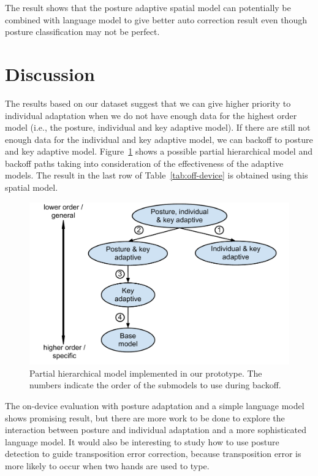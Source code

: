 \documentclass{sigchi}
\begin{document}
The result shows that the posture adaptive spatial model can potentially be combined 
with language model to give better auto correction result even though posture
classification may not be perfect. 

\section{Discussion}
The results based on our dataset suggest that we
can give higher priority to individual adaptation when we do not have enough data for
the highest order model (i.e., the posture, individual and key adaptive model). 
If there are still not enough data for the individual and key adaptive model, we 
can backoff to posture and key adaptive model. Figure~\ref{fig:partial-hierarchy} 
shows a possible partial hierarchical model and backoff paths taking into consideration
of the effectiveness of the adaptive models. The result in the
last row of Table~\ref{tab:off-device} is obtained using this spatial model.

\begin{figure}
  \centering
  \includegraphics[width=0.9\columnwidth]{figures/partial-hierarchy.pdf}
  \caption{Partial hierarchical model implemented in our prototype. The numbers indicate the order of the 
submodels to use during backoff.}
  \label{fig:partial-hierarchy}
\end{figure}
The on-device evaluation with posture adaptation and a simple language model shows promising result, but there are
more work to be done to explore the interaction between posture and individual adaptation and
a more sophisticated language model. It would also be interesting to study how
to use posture detection to guide transposition error correction, because transposition error
is more likely to occur when two hands are used to type.
\end{document}
